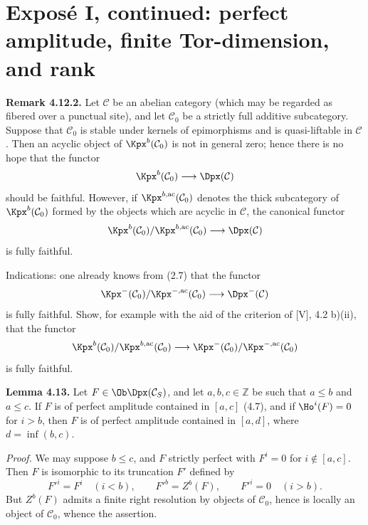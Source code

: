 \providecommand{\Add}{\operatorname{Add}}
\providecommand{\Cart}{\operatorname{Cart}}
\providecommand{\perfamp}{\operatorname{perf.amp}}
\providecommand{\perfdim}{\operatorname{perf.dim}}
\providecommand{\toramp}{\operatorname{tor.amp}}
\providecommand{\torf}{\operatorname{torf}}
\providecommand{\injf}{\operatorname{injf}}
\providecommand{\rg}{\operatorname{rg}}
\providecommand{\is}{\mathrm{is}}
\providecommand{\Mod}{\operatorname{Mod}}


\section*{Exposé I, continued: perfect amplitude, finite Tor-dimension, and rank}

\textbf{Remark 4.12.2.} Let \(\mathcal C\) be an abelian category (which may be regarded as fibered over a punctual site), and let \(\mathcal C_0\) be a strictly full additive subcategory. Suppose that \(\mathcal C_0\) is stable under kernels of epimorphisms and is quasi-liftable in \(\mathcal C\). Then an acyclic object of \(\Kpx^b(\mathcal C_0)\) is not in general zero; hence there is no hope that the functor
\[
  \Kpx^b(\mathcal C_0)\longrightarrow \Dpx(\mathcal C)
\]
should be faithful. However, if \(\Kpx^{b,\mathrm{ac}}(\mathcal C_0)\) denotes the thick subcategory of \(\Kpx^b(\mathcal C_0)\) formed by the objects which are acyclic in \(\mathcal C\), the canonical functor
\[
  \Kpx^b(\mathcal C_0)/\Kpx^{b,\mathrm{ac}}(\mathcal C_0)
  \longrightarrow \Dpx(\mathcal C)
\]
is fully faithful.

Indications: one already knows from (2.7) that the functor
\[
  \Kpx^-(\mathcal C_0)/\Kpx^{-,\mathrm{ac}}(\mathcal C_0)
  \longrightarrow \Dpx^-(\mathcal C)
\]
is fully faithful. Show, for example with the aid of the criterion of [V], 4.2 b)(ii), that the functor
\[
  \Kpx^b(\mathcal C_0)/\Kpx^{b,\mathrm{ac}}(\mathcal C_0)
  \longrightarrow
  \Kpx^-(\mathcal C_0)/\Kpx^{-,\mathrm{ac}}(\mathcal C_0)
\]
is fully faithful.

\textbf{Lemma 4.13.} Let \(F\in\Ob \Dpx(\mathcal C_S)\), and let \(a,b,c\in\mathbb Z\) be such that \(a\leq b\) and \(a\leq c\). If \(F\) is of perfect amplitude contained in \([a,c]\) (4.7), and if \(\Ho^i(F)=0\) for \(i>b\), then \(F\) is of perfect amplitude contained in \([a,d]\), where \(d=\inf(b,c)\).

\emph{Proof.} We may suppose \(b\leq c\), and \(F\) strictly perfect with \(F^i=0\) for \(i\notin [a,c]\). Then \(F\) is isomorphic to its truncation \(F'\) defined by
\[
  F'^i=F^i\quad (i<b),\qquad F'^b=Z^b(F),\qquad F'^i=0\quad (i>b).
\]
But \(Z^b(F)\) admits a finite right resolution by objects of \(\mathcal C_0\), hence is locally an object of \(\mathcal C_0\), whence the assertion.

